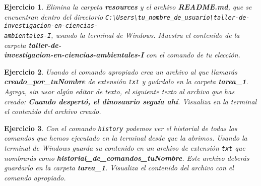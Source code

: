 \documentclass[12pt,letterpaper]{article}
\newtheorem{exercise}{Ejercicio}
\begin{document}
\begin{exercise}
Elimina la carpeta \textbf{resources} y el archivo \textbf{README.md}, que se encuentran dentro del directorio \verb|C:\Users\tu_nombre_de_usuario\taller-de-investigacion-en-ciencias-|\\\verb|ambientales-I|, usando la terminal de Windows. Muestra el contenido de la carpeta \textbf{taller-de-\\investigacion-en-ciencias-ambientales-I} con el comando de tu elección.
\end{exercise}
\begin{exercise}
Usando el comando apropiado crea un archivo al que llamarás \textbf{creado\_por\_tuNombre} de extensión \verb|txt| y guárdalo en la carpeta \textbf{tarea\_1}. Agrega, sin usar algún editor de texto, el siguiente texto al archivo que has creado: \textbf{Cuando despertó, el dinosaurio seguía ahí}. Visualiza en la terminal el contenido del archivo creado.
\end{exercise}
\begin{exercise}
Con el comando \verb|history| podemos ver el historial de todas los comandos que hemos ejecutado en la terminal desde que la abrimos. Usando la terminal de Windows guarda su contenido en un archivo de extensión \verb|txt| que nombrarás como \textbf{historial\_de\_comandos\_tuNombre}. Este archivo deberás guardarlo en la carpeta \textbf{tarea\_1}. Visualiza el contenido del archivo con el comando apropiado.
\end{exercise}
\end{document}
